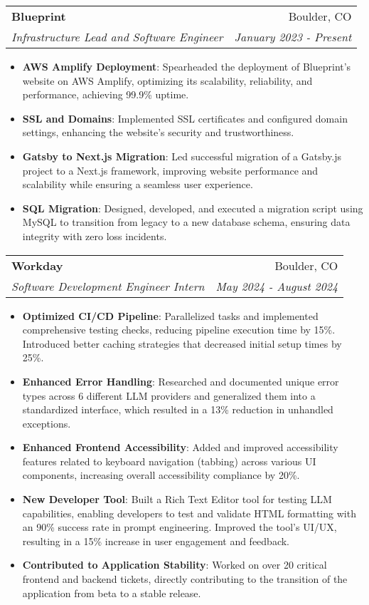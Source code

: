 \documentclass[letterpaper,11pt]{article}
\makeatletter
\newcommand{\resumeItem}[2]{
  \item\small{
    \textbf{#1}{: #2 \vspace{-2pt}}
  }
}
\newcommand{\resumeSubheading}[4]{
  \vspace{-1pt}\item
    \begin{tabular*}{0.97\textwidth}[t]{l@{\extracolsep{\fill}}r}
      \textbf{#1} & #2\vspace{-2pt} \\
      \textit{\small#3} & \textit{\small #4} \\
    \end{tabular*}\vspace{-8pt}
}
\newcommand{\resumeItemListStart}{\begin{itemize}}
\newcommand{\resumeItemListEnd}{\end{itemize}\vspace{-8pt}}
\makeatother
\begin{document}
\resumeSubheading
{Blueprint}{Boulder, CO}
{Infrastructure Lead and Software Engineer}{January 2023 - Present}
\resumeItemListStart
\resumeItem{AWS Amplify Deployment}
{Spearheaded the deployment of Blueprint's website on AWS Amplify, optimizing its scalability, reliability, and performance, achieving 99.9\% uptime.}
\resumeItem{SSL and Domains}
{Implemented SSL certificates and configured domain settings, enhancing the website's security and trustworthiness.}
\resumeItem{Gatsby to Next.js Migration}
{Led successful migration of a Gatsby.js project to a Next.js framework, improving website performance and scalability while ensuring a seamless user experience.}
\resumeItem{SQL Migration}
{Designed, developed, and executed a migration script using MySQL to transition from legacy to a new database schema, ensuring data integrity with zero loss incidents.}
\resumeItemListEnd

\resumeSubheading
{Workday}{Boulder, CO}
{Software Development Engineer Intern}{May 2024 - August 2024}
\resumeItemListStart
\resumeItem{Optimized CI/CD Pipeline}
{Parallelized tasks and implemented comprehensive testing checks, reducing pipeline execution time by 15\%. Introduced better caching strategies that decreased initial setup times by 25\%.}
\resumeItem{Enhanced Error Handling}
{Researched and documented unique error types across 6 different LLM providers and generalized them into a standardized interface, which resulted in a 13\% reduction in unhandled exceptions.}
\resumeItem{Enhanced Frontend Accessibility}
{Added and improved accessibility features related to keyboard navigation (tabbing) across various UI components, increasing overall accessibility compliance by 20\%.}
\resumeItem{New Developer Tool}
{Built a Rich Text Editor tool for testing LLM capabilities, enabling developers to test and validate HTML formatting with an 90\% success rate in prompt engineering. Improved the tool's UI/UX, resulting in a 15\% increase in user engagement and feedback.}
\resumeItem{Contributed to Application Stability}
{Worked on over 20 critical frontend and backend tickets, directly contributing to the transition of the application from beta to a stable release.}
\resumeItemListEnd
\end{document}
